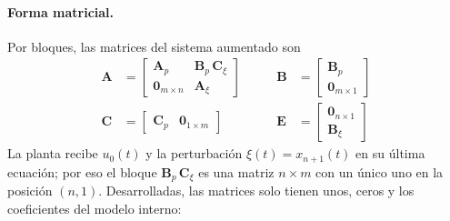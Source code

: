 \paragraph{Forma matricial.} Por bloques, las matrices del sistema aumentado son
\begin{equation}
  \begin{aligned}
  \mathbf{A} &=
  \begin{bmatrix}
  \mathbf{A}_p & \mathbf{B}_p\,\mathbf{C}_{\xi} \\
  \mathbf{0}_{m \times n} & \mathbf{A}_{\xi}
  \end{bmatrix}
  & \qquad
  \mathbf{B} &=
  \begin{bmatrix} \mathbf{B}_p \\ \mathbf{0}_{m \times 1} \end{bmatrix} \\[1.5em]
  \mathbf{C} &=
  \begin{bmatrix} \mathbf{C}_p & \mathbf{0}_{1 \times m} \end{bmatrix}
  & \qquad
  \mathbf{E} &=
  \begin{bmatrix} \mathbf{0}_{n \times 1} \\ \mathbf{B}_{\xi} \end{bmatrix}
  \end{aligned}
\label{eq:aumentado_matrices}
\end{equation}
La planta recibe $u_0(t)$ y la perturbación $\xi(t) = x_{n+1}(t)$ en su última ecuación;
por eso el bloque $\mathbf{B}_p\,\mathbf{C}_{\xi}$ es una matriz $n \times m$
con un único uno en la posición $(n,1)$. Desarrolladas, las matrices solo tienen
unos, ceros y los coeficientes del modelo interno:

